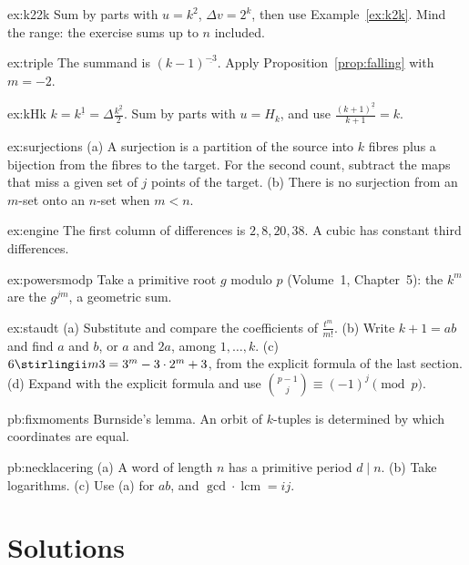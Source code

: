 \begin{hint}{ex:k22k}
Sum by parts with $u=k^2$, $\Delta v=2^k$, then use Example~\ref{ex:k2k}. Mind the range: the exercise sums up to $n$
included.
\end{hint}
\begin{hint}{ex:triple}
The summand is $(k-1)^{\underline{-3}}$. Apply Proposition~\ref{prop:falling} with $m=-2$.
\end{hint}
\begin{hint}{ex:kHk}
$k=k^{\underline1}=\Delta\frac{k^{\underline2}}2$. Sum by parts with $u=H_k$, and use $\frac{(k+1)^{\underline2}}{k+1}=k$.
\end{hint}
\begin{hint}{ex:surjections}
(a) A surjection is a partition of the source into $k$ fibres plus a bijection from the fibres to the target. For the
second count, subtract the maps that miss a given set of $j$ points of the target.
(b) There is no surjection from an $m$-set onto an $n$-set when $m<n$.
\end{hint}
\begin{hint}{ex:engine}
The first column of differences is $2,8,20,38$. A cubic has constant third differences.
\end{hint}
\begin{hint}{ex:powersmodp}
Take a primitive root $g$ modulo $p$ (Volume~1, Chapter~5): the $k^m$ are the $g^{jm}$, a geometric sum.
\end{hint}
\begin{hint}{ex:staudt}
(a) Substitute and compare the coefficients of $\frac{t^m}{m!}$. (b) Write $k+1=ab$ and find $a$ and $b$, or $a$ and $2a$,
among $1,\dots,k$. (c) $6\stirlingii m3=3^m-3\cdot2^m+3$, from the explicit formula of the last section. (d) Expand with the
explicit formula and use $\binom{p-1}j\equiv(-1)^j\pmod p$.
\end{hint}

\begin{hint}{pb:fixmoments}
Burnside's lemma. An orbit of $k$-tuples is determined by which coordinates are equal.
\end{hint}

\begin{hint}{pb:necklacering}
(a) A word of length $n$ has a primitive period $d\mid n$. (b) Take logarithms. (c) Use (a) for $ab$, and $\gcd\cdot\operatorname{lcm}=ij$.
\end{hint}

\section{Solutions}

